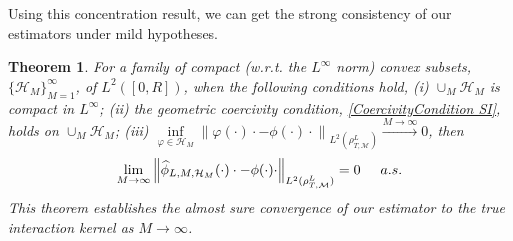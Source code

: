 \documentclass[11pt]{article}
\newtheorem{theorem}{Theorem}[section]
\newcommand{\norm}[1]{\left\| #1 \right\|}
\newcommand{\mH}{\mathcal{H}}
\newcommand{\mM}{\mathcal{M}}
\newcommand{\intkernel}{\phi}
\newcommand{\lintkernel}{\widehat{\intkernel}}
\newcommand{\intkernelvar}{\varphi}
\begin{document}
Using this concentration result, we can get the strong consistency of our estimators under mild hypotheses.  
\begin{theorem}\label{consistency SI}
For a family of compact (w.r.t. the $L^{\infty}$ norm) convex subsets, $\{\mH_M\}_{M = 1}^{\infty}$, of $L^2([0,R])$, when the following conditions hold, (i) $\cup_M \mH_M$ is compact in $L^{\infty}$; (ii) the geometric coercivity condition, \eqref{CoercivityCondition SI}, holds on $\cup_M \mH_M$;
(iii) $\inf\limits_{\intkernelvar \in \mH_M} \norm{\intkernelvar(\cdot)\cdot - \intkernel(\cdot)\cdot}_{L^2(\rho_{T, \mM}^L)} \stackrel{M\to\infty}{\longrightarrow} 0$,
then 
\begin{equation}
\lim_{M \to \infty}\norm{\lintkernel_{L, M, \mH_M}(\cdot)\cdot - \intkernel(\cdot)\cdot}_{L^2(\rho_{T, \mM}^L)}  = 0 \hspace{0.5 cm} a.s.
\end{equation}  
This theorem establishes the almost sure convergence of our estimator to the true interaction kernel as $M \to \infty$. 
\end{theorem}
%
\end{document}
